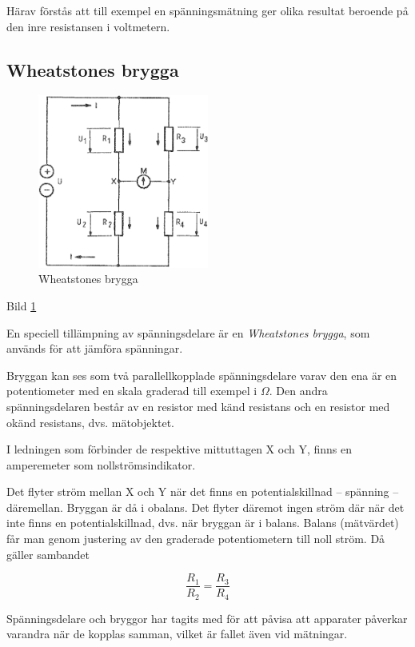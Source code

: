 Härav förstås att till exempel en spänningsmätning ger olika resultat beroende på den
inre resistansen i voltmetern.

\subsection{Wheatstones brygga}

\begin{figure}
\includegraphics[width=0.5\textwidth]{images/cropped_pdfs/bild_2_3-04.pdf}
\caption{Wheatstones brygga}
\label{fig:BildII3-04}
\end{figure}

Bild \ref{fig:BildII3-04}

En speciell tillämpning av spänningsdelare är en \emph{Wheatstones brygga},
som används för att jämföra spänningar.

Bryggan kan ses som två parallellkopplade spänningsdelare varav den ena är en
potentiometer med en skala graderad till exempel i \(\Omega\).
Den andra spänningsdelaren består av en resistor med känd resistans och en
resistor med okänd resistans, dvs. mätobjektet.

I ledningen som förbinder de respektive mittuttagen X och Y, finns en
amperemeter som nollströmsindikator.

Det flyter ström mellan X och Y när det finns en potentialskillnad -- spänning
-- däremellan.
Bryggan är då i obalans.
Det flyter däremot ingen ström där när det inte finns en potentialskillnad,
dvs. när bryggan är i balans.
Balans (mätvärdet) får man genom justering av den graderade potentiometern
till noll ström.
Då gäller sambandet

\[\frac{R_1}{R_2} = \frac{R_3}{R_4}\]

Spänningsdelare och bryggor har tagits med för att påvisa att apparater påverkar
varandra när de kopplas samman, vilket är fallet även vid mätningar.


